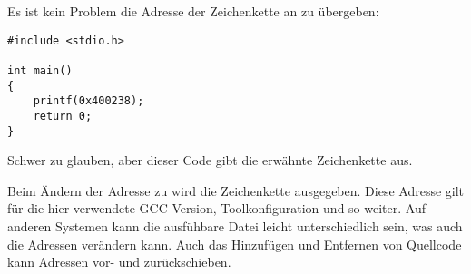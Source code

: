 Es ist kein Problem die Adresse der Zeichenkette 
an  zu übergeben:

\begin{lstlisting}[style=customc]
#include <stdio.h>

int main()
{
    printf(0x400238);
    return 0;
}
\end{lstlisting}

Schwer zu glauben, aber dieser Code gibt die erwähnte Zeichenkette aus.

Beim Ändern der Adresse zu  wird die Zeichenkette  ausgegeben.
Diese Adresse gilt für die hier verwendete GCC-Version, Toolkonfiguration und so weiter.
Auf anderen Systemen kann die ausfühbare Datei leicht unterschiedlich sein, was auch
die Adressen verändern kann.
Auch das Hinzufügen und Entfernen von Quellcode kann Adressen vor- und zurückschieben.
